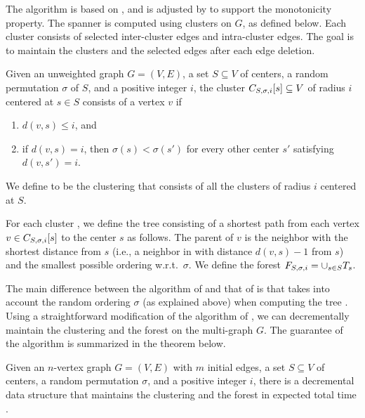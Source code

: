 The algorithm is based on \cite{Baswana:2012aa}, and is adjusted by \cite{Abraham:2016aa} to support the monotonicity property.
The spanner is computed using clusters on \( G \), as defined below.
Each cluster consists of selected inter-cluster edges and intra-cluster edges.
The goal is to maintain the clusters and the selected edges after each edge deletion.

\begin{definition}[Clusters] \label{def:clusters}
Given an unweighted graph \( G = (V, E) \), a set \( S \subseteq V \) of centers, a random permutation \( \sigma \) of \( S \), and a positive integer \( i \), 
the cluster \( C_{S, \sigma, i} [s] \subseteq V \) of radius \( i \) centered at \( s \in S \) consists of a vertex \( v \) if 
\begin{enumerate}
\item \( d(v, s) \leq i \), and
\item if \( d(v, s) = i \), then \( \sigma(s) < \sigma(s') \) for every other center \( s' \) satisfying \( d(v, s') = i \).
\end{enumerate}
We define  to be the clustering that consists of all the clusters of radius \( i \) centered at \( S \).
\end{definition}




For each cluster , we define the tree  consisting of a shortest path from each vertex  \( v \in C_{S, \sigma, i} [s] \) to the center \( s \) as follows.
The parent of \( v \) is the neighbor with the shortest distance from \( s \) (i.e., a neighbor in  with distance \( d(v, s) - 1 \) from \( s \)) and the smallest possible ordering w.r.t.\ \( \sigma \).
We define the forest \( F_{S, \sigma, i}  = \cup_{s \in S} T_s \).

The main difference between the algorithm of \cite{Baswana:2012aa} and that of \cite{Abraham:2016aa} is that \cite{Abraham:2016aa} takes into account the random ordering \( \sigma \) (as explained above) when computing the tree .
Using a straightforward modification of the algorithm of \citeauthor{Even:1981aa} \cite{Even:1981aa}, we can decrementally maintain the clustering  and the forest  on the multi-graph \( G \).
The guarantee of the algorithm is summarized in the theorem below.



\begin{theorem} \label{th:intra_cluster}
Given an \( n \)-vertex graph \( G = (V, E) \) with \( m \) initial edges, a set \( S \subseteq V \) of centers, a random permutation \( \sigma \), and a positive integer \( i \), there is a decremental data structure that maintains the clustering  and the forest 
in expected total time .
\end{theorem}




